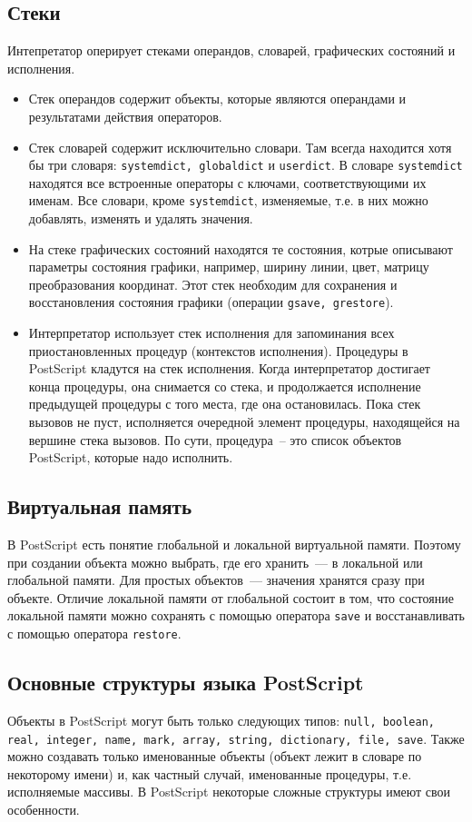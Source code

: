\subsection{Стеки}
Интепретатор оперирует стеками операндов, словарей, графических состояний и исполнения. 
\begin{itemize}
\item Стек операндов содержит объекты, которые являются операндами и результатами действия операторов. 
\item Стек словарей содержит исключительно словари. Там всегда находится хотя бы три словаря: \texttt{systemdict, globaldict} и \texttt{userdict}. В словаре \texttt{systemdict} находятся все встроенные операторы с ключами, соответствующими их именам. Все словари, кроме \texttt{systemdict}, изменяемые, т.е. в них можно добавлять, изменять и удалять значения.
\item На стеке графических состояний находятся те состояния, котрые описывают параметры состояния графики, например, ширину линии, цвет, матрицу преобразования координат. Этот стек необходим для сохранения и восстановления состояния графики (операции \texttt{gsave, grestore}).
\item Интерпретатор использует стек исполнения для запоминания всех приостановленных процедур (контекстов исполнения). Процедуры в PostScript кладутся на стек исполнения. Когда интерпретатор достигает конца процедуры, она снимается со стека, и продолжается исполнение предыдущей процедуры с того места, где она  остановилась. Пока стек вызовов не пуст, исполняется очередной элемент процедуры, находящейся на вершине стека вызовов. По сути, процедура~-- это список объектов PostScript, которые надо исполнить.
\end{itemize}
 
\subsection{Виртуальная память}
В PostScript есть понятие глобальной и локальной виртуальной памяти. Поэтому при создании объекта можно выбрать, где его хранить~--- в локальной или глобальной памяти. Для простых объектов~--- значения хранятся сразу при объекте. Отличие локальной памяти от глобальной состоит в том, что состояние локальной памяти можно сохранять с помощью оператора \texttt{save} и восстанавливать с помощью оператора \texttt{restore}.


\subsection{Основные структуры языка PostScript}
Объекты в PostScript могут быть только следующих типов: \texttt{null, boolean, real, integer, name, mark, array, string, dictionary, file, save}. Также можно создавать только именованные объекты (объект лежит в словаре по некоторому имени) и, как частный случай, именованные процедуры, т.е. исполняемые массивы. В PostScript некоторые сложные структуры имеют свои особенности.

